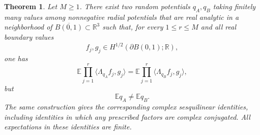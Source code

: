 \documentclass[11pt]{article}
\newcommand{\R}{\mathbb R}
\newcommand{\E}{\mathbb E}
\newcommand{\la}{\langle}
\newcommand{\ra}{\rangle}
\theoremstyle{plain}
\newtheorem{theorem}{Theorem}[section]
\theoremstyle{definition}
\theoremstyle{remark}
\begin{document}
\begin{theorem}\label{thm:finite-DN-moments-not-enough}
Let $M\ge1$.  There exist two random potentials $q_A,q_B$ taking finitely many values among nonnegative radial potentials that are real analytic in a neighborhood of $\overline{B(0,1)}\subset\R^3$ such that, for every $1\le r\le M$ and all real boundary values
\[
  f_j,g_j\in H^{1/2}(\partial B(0,1);\R),
\]
one has
\begin{equation}\label{eq:finite-DN-moment-equality}
  \E\prod_{j=1}^r\la\Lambda_{q_A}f_j,g_j\ra
  =
  \E\prod_{j=1}^r\la\Lambda_{q_B}f_j,g_j\ra,
\end{equation}
but
\[
  \E q_A\ne\E q_B.
\]
The same construction gives the corresponding complex sesquilinear identities, including identities in which any prescribed factors are complex conjugated.  All expectations in these identities are finite.
\end{theorem}
\end{document}
